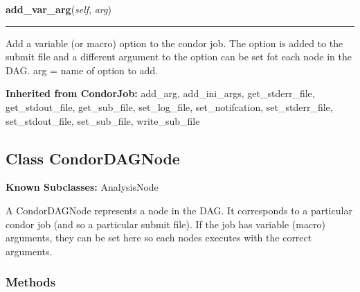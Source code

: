     \noindent\begin{boxedminipage}{\textwidth}

    \raggedright \textbf{add\_var\_arg}(\textit{self}, \textit{arg})

    \vspace{-1.5ex}

    \rule{\textwidth}{0.5\fboxrule}
    Add a variable (or macro) option to the condor job. The option is 
    added to the submit file and a different argument to the option can 
    be set fot each node in the DAG. arg = name of option to add.

    \vspace{1ex}

    \end{boxedminipage}

  \textbf{Inherited from CondorJob:}
    add\_arg,
    add\_ini\_args,
    get\_stderr\_file,
    get\_stdout\_file,
    get\_sub\_file,
    set\_log\_file,
    set\_notifcation,
    set\_stderr\_file,
    set\_stdout\_file,
    set\_sub\_file,
    write\_sub\_file


\subsection{Class CondorDAGNode}

    \label{pipeline:CondorDAGNode}
\textbf{Known Subclasses:} AnalysisNode

A CondorDAGNode represents a node in the DAG. It corresponds to a 
particular condor job (and so a particular submit file). If the job has 
variable (macro) arguments, they can be set here so each nodes executes 
with the correct arguments.



  \subsubsection{Methods}

